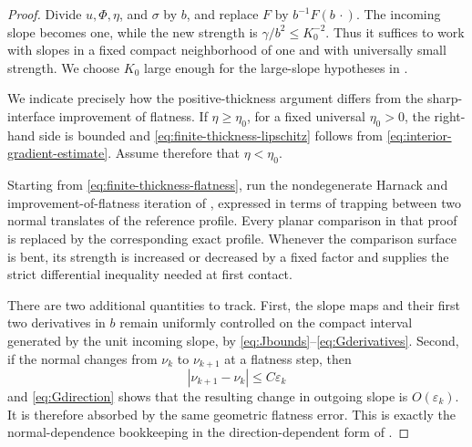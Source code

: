 \documentclass[11pt,letterpaper]{amsart}
\numberwithin{equation}{section}
\theoremstyle{definition}
\theoremstyle{remark}
\begin{document}
\begin{proof}
Divide $u,\Phi,\eta$, and $\sigma$ by $b$, and replace $F$ by
$b^{-1}F(b\,\cdot)$.  The incoming slope becomes one, while the new strength
is $\gamma/b^2\leq K_0^{-2}$.  Thus it suffices to work with slopes in a
fixed compact neighborhood of one and with universally small strength.  We
choose $K_0$ large enough for the large-slope hypotheses in
.

We indicate precisely how the positive-thickness argument differs from the
sharp-interface improvement of flatness.  If $\eta\geq\eta_0$, for a fixed
universal $\eta_0>0$, the right-hand side is bounded and
\eqref{eq:finite-thickness-lipschitz} follows from
\eqref{eq:interior-gradient-estimate}.  Assume therefore that
$\eta<\eta_0$.

Starting from \eqref{eq:finite-thickness-flatness}, run the nondegenerate
Harnack and improvement-of-flatness iteration of
\cite[Theorems~3.1--3.2]{DeSilvaSavin}, expressed in terms of trapping between two
normal translates of the reference profile.  Every planar comparison in
that proof is replaced by the corresponding exact profile.  Whenever the
comparison surface is bent, its strength is increased or decreased by a
fixed factor and  supplies the strict
differential inequality needed at first contact.

There are two additional quantities to track.  First, the slope maps and
their first two derivatives in $b$ remain uniformly controlled on the
compact interval generated by the unit incoming slope, by
\eqref{eq:Jbounds}--\eqref{eq:Gderivatives}.  Second, if the normal changes
from $\nu_k$ to $\nu_{k+1}$ at a flatness step, then
$$
|\nu_{k+1}-\nu_k|\leq C\varepsilon_k
$$
and \eqref{eq:Gdirection} shows that the resulting change in outgoing
slope is $O(\varepsilon_k)$.  It is therefore absorbed by the same geometric
flatness error.  This is exactly the normal-dependence bookkeeping in the
direction-dependent form of .


\end{proof}
\end{document}
